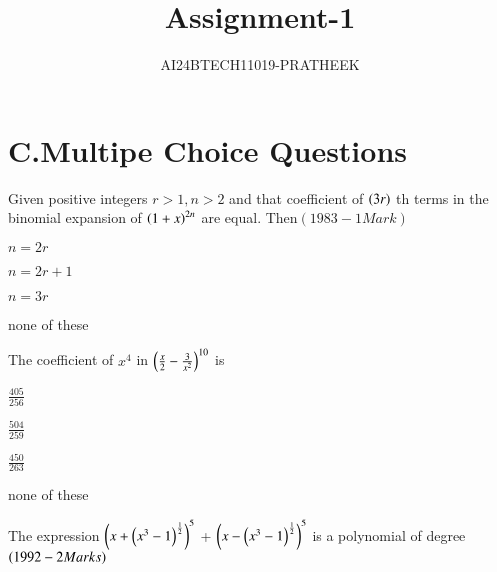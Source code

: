 \documentclass[journal,12pt,onecolumn]{IEEEtran}
\theoremstyle{remark}
\begin{document}

\vspace{3cm}

\title{Assignment-1}
\author{AI24BTECH11019-PRATHEEK}
\maketitle
\bigskip

\renewcommand{\thefigure}{\theenumi}
\renewcommand{\thetable}{\theenumi}

\section*{{C.Multipe Choice Questions}}
\begin{enumerate}
\item   Given positive integers $r>1,n>2$ and that {coefficient} of $\left(3r\right)$ th terms in the binomial expansion of $\left(1+x\right)^{2n}$ are equal. Then\hfill{${(1983-1Mark)}$}
\begin{enumerate}\begin{multicols}{2}
\item $n=2r$
\item $n=2r+1$
\item $n=3r$
\item none of these
\end{multicols}
\end{enumerate}
\item The coefficient of $x^4$ in $\left(\frac{x}{2}-\frac{3}{x^2}\right)^{10}$ is \hfill{{}
\begin{enumerate}
\begin{multicols}{2}
\item $\frac{405}{256}$
\item $\frac{504}{259}$
    
\item $\frac{450}{263}$
\item none of these
\end{multicols}
\end{enumerate}
\item The expression $\left(x+\left(x^3-1\right)^{\frac{1}{2}}\right)^5$ + $\left(x-\left(x^3-1\right)^{\frac{1}{2}}\right)^5$ is a polynomial of degree\hfill{$\left(1992-2Marks\right)$}
\begin{enumerate}
\begin{multicols}{2}
    


\end{multicols}
\end{enumerate}}
\end{enumerate}
\end{document}
